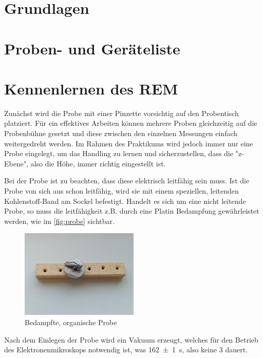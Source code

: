 \documentclass[12pt,english,ngerman]{scrartcl}
\begin{document}
\section{Grundlagen}



\section{Proben- und Geräteliste}


\section{Kennenlernen des REM}


Zunächst wird die Probe mit einer Pinzette vorsichtig auf den Probentisch platziert. Für ein effektives Arbeiten können 
mehrere Proben gleichzeitig auf die Probenbühne gesetzt und diese zwischen den einzelnen Messungen einfach weitergedreht
werden. Im Rahmen des Praktikums wird jedoch immer nur eine Probe eingelegt, um das Handling zu lernen und sicherzustellen,
dass die "z-Ebene", also die Höhe, immer richtig eingestellt ist.

Bei der Probe ist zu beachten, dass diese elektrisch leitfähig sein muss. Ist die Probe von sich aus schon leitfähig, wird
sie mit einem speziellen, leitenden Kohlenstoff-Band am Sockel befestigt. Handelt es sich um eine nicht leitende Probe, so 
muss die leitfähigkeit z.B. durch eine Platin Bedampfung gewährleistet werden, wie im \autoref{fig:probe} sichtbar.

\begin{figure}[H]
	\begin{center}
		\includegraphics[width =0.5\textwidth]{./figures/probe.png}
	\end{center}
	\caption[Bedampfte, organische Probe]
	{Bedampfte, organische Probe \cite{sein_foto}}
    \label{fig:probe}
\end{figure}

Nach dem Einlegen der Probe wird ein Vakuum erzeugt, welches für den Betrieb des Elektronenmikroskops notwendig ist, was 
\SI{162(1)}{\s}, also keine \SI{3}{\min} dauert.
\end{document}
